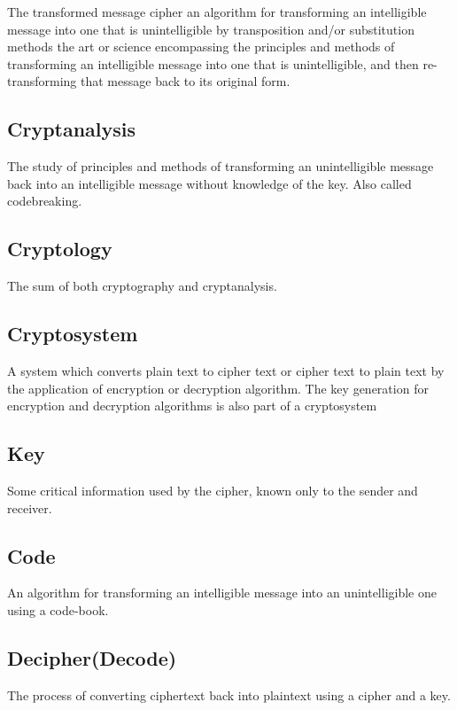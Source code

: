 \documentclass[british]{article}
\begin{document}
The transformed message cipher an algorithm for transforming an intelligible
message into one that is unintelligible by transposition and/or substitution
methods the art or science encompassing the principles and methods
of transforming an intelligible message into one that is unintelligible,
and then re-transforming that message back to its original form.

\subsection{Cryptanalysis}

The study of principles and methods of transforming an unintelligible
message back into an intelligible message without knowledge of the
key. Also called codebreaking.

\subsection{Cryptology}

The sum of both cryptography and cryptanalysis.

\subsection{Cryptosystem}

A system which converts plain text to cipher text or cipher text to
plain text by the application of encryption or decryption algorithm.
The key generation for encryption and decryption algorithms is also
part of a cryptosystem

\subsection{Key}

Some critical information used by the cipher, known only to the sender
and receiver.

\subsection{Code}

An algorithm for transforming an intelligible message into an unintelligible
one using a code-book.

\subsection{Decipher(Decode)}

The process of converting ciphertext back into plaintext using a cipher
and a key.
\end{document}
